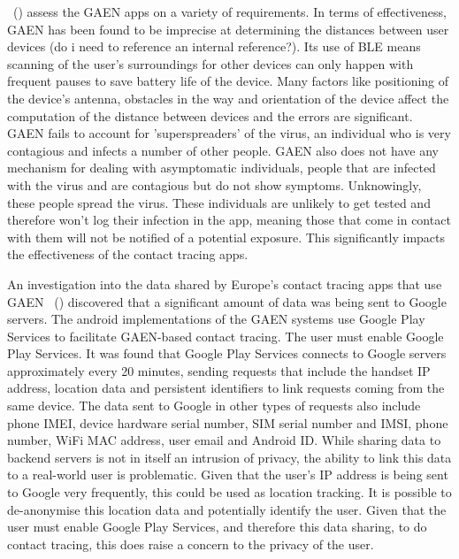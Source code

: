 ~(\cite{9931613})  assess the GAEN apps on a variety of requirements. In terms of effectiveness, GAEN has been found to be imprecise at determining the distances between user devices (do i need to reference an internal reference?). Its use of BLE means scanning of the user's surroundings for other devices can only happen with frequent pauses to save battery life of the device. Many factors like positioning of the device's antenna, obstacles in the way and orientation of the device affect the computation of the distance between devices and the errors are significant. GAEN fails to account for 'superspreaders' of the virus, an individual who is very contagious and infects a number of other people. GAEN also does not have any mechanism for dealing with asymptomatic individuals, people that are infected with the virus and are contagious but do not show symptoms. Unknowingly, these people spread the virus. These individuals are unlikely to get tested and therefore won't log their infection in the app, meaning those that come in contact with them will not be notified of a potential exposure. This significantly impacts the effectiveness of the contact tracing apps. \par
An investigation into the data shared by Europe's contact tracing apps that use GAEN ~(\cite{9488728}) discovered that a significant amount of data was being sent to Google servers. The android implementations of the GAEN systems use Google Play Services to facilitate GAEN-based contact tracing. The user must enable Google Play Services. It was found that Google Play Services connects to Google servers approximately every 20 minutes, sending requests that include the handset IP address, location data and persistent identifiers to link requests coming from the same device. The data sent to Google in other types of requests also include phone IMEI, device hardware serial number, SIM serial number and IMSI, phone number, WiFi MAC address, user email and Android ID. While sharing data to backend servers is not in itself an intrusion of privacy, the ability to link this data to a real-world user is problematic. Given that the user's IP address is being sent to Google very frequently, this could be used as location tracking. It is possible to de-anonymise this location data and potentially identify the user. Given that the user must enable Google Play Services, and therefore this data sharing, to do contact tracing, this does raise a concern to the privacy of the user. \par


